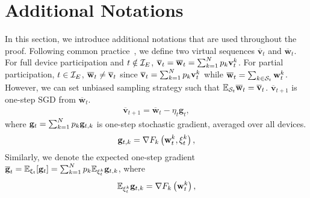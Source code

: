 
\section{Additional Notations}
\label{sec:app:notations}
In this section, we introduce additional notations that are used throughout
the proof. Following common practice~\cite{stich2018local,li2019convergence}, we define two virtual sequences $\overline{\mathbf{v}}_{t}$ and $\overline{\mathbf{w}}_{t}$. For full device participation and $t \notin {\mathcal{I}}_E$,
${\overline{\mathbf{v}}}_t = {\overline{\mathbf{w}}}_t =\sum_{k=1}^{N} p_{k} \mathbf{v}_{t}^{k}$. For partial participation, $t \in {\mathcal{I}}_E$, ${\overline{\mathbf{w}}}_t \neq {\overline{\mathbf{v}}}_t$ since ${\overline{\mathbf{v}}}_t=\sum_{k=1}^{N} p_{k} \mathbf{v}_{t}^{k}$ while ${\overline{\mathbf{w}}}_t=\sum_{k\in {\mathcal{S}}_t}\mathbf{w}_{t}^{k}$. However, we can
set unbiased sampling strategy such that $ \mathbb{E}_{{\mathcal{S}}_t} {\overline{\mathbf{w}}}_t = {\overline{\mathbf{v}}}_t$.
$\overline{\mathbf{v}}_{t+1}$ is one-step SGD from $\overline{\mathbf{w}}_{t}$. 
\begin{align}
\overline{\mathbf{v}}_{t+1}=\overline{\mathbf{w}}_{t}-\eta_{t} \mathbf{g}_{t},	\label{eq:vbar}
\end{align}
where ${\mathbf{g}}_{t} = \sum_{k=1}^{N} p_{k} {\mathbf{g}}_{t,k} $ is one-step stochastic gradient, averaged over all devices. 
\begin{align*}
{\mathbf{g}}_{t,k} = \nabla F_{k}\left(\mathbf{w}_{t}^{k},\xi_{t}^{k} \right),   
\end{align*}
Similarly, we denote the expected one-step gradient ${\overline{\mathbf{g}}}_{t}= \mathbb{E}_{\xi_t}[{\mathbf{g}}_t] = \sum_{k=1}^{N} p_{k} \mathbb{E}_{\xi_{t}^{k}} {\mathbf{g}}_{t,k}$, where
\begin{align*}
\mathbb{E}_{\xi_{t}^{k}} {\mathbf{g}}_{t,k}  = \nabla F_{k}\left(\mathbf{w}_{t}^{k}\right), 
\end{align*}
